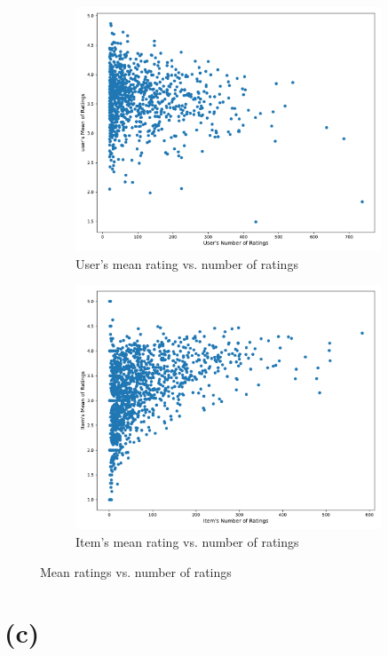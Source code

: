 \begin{figure}[htbp]
\centering
\begin{subfigure}[b]{0.5\linewidth}
  \includegraphics[width=1.00\textwidth]{./figures/user_mean_rating.pdf}
  \caption{User's mean rating vs. number of ratings}
   \label{ex_without_source}
\end{subfigure}%
\begin{subfigure}[b]{0.5\linewidth}
  \centering
  \includegraphics[width=1.00\textwidth]{./figures/item_mean_rating.pdf}
  \caption{Item's mean rating vs. number of ratings}
  \label{ex_with_source}
\end{subfigure}%
\raggedright
\caption{Mean ratings vs. number of ratings}
\label{fig:source_injection}
\end{figure}

\section*{(c)}


\clearpage

%
%
%



